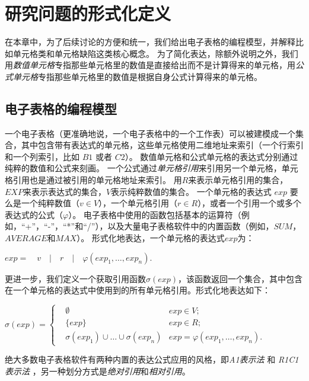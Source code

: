 \chapter{研究问题的形式化定义}

在本章中，为了后续讨论的方便和统一，我们给出电子表格的编程模型，并解释比如单元格类和单元格缺陷这类核心概念。
为了简化表达，除额外说明之外，我们用\textit{数值单元格}专指那些单元格里的数值是直接给出而不是计算得来的单元格，用\textit{公式单元格}专指那些单元格里的数值是根据自身公式计算得来的单元格。

\section{电子表格的编程模型}

一个电子表格（更准确地说，一个电子表格中的一个工作表）可以被建模成一个集合，其中包含带有表达式的单元格，这些单元格使用二维地址来索引（一个行索引和一个列索引，比如 $B1$ 或者 $C2$）。
数值单元格和公式单元格的表达式分别通过纯粹的数值和公式来刻画。
一个公式通过\textit{单元格引用}来引用另一个单元格，单元格引用也是通过被引用的单元格地址来索引。
用$R$来表示单元格引用的集合，$EXP$来表示表达式的集合，$V$表示纯粹数值的集合。
一个单元格的表达式 $exp$ 要么是一个纯粹数值（$v \in V$），一个单元格引用（$r \in R$），或者一个引用一个或多个表达式的公式（$\varphi $）。
电子表格中使用的函数包括基本的运算符（例如，“+”，“-”，“*”和“/”），以及大量电子表格软件中的内置函数（例如，$SUM$，$AVERAGE$和$MAX$）。
形式化地表达，一个单元格的表达式$exp$为：
\begin{definition}
    $ exp =\quad v\quad |\quad r\quad |\quad \varphi (exp_1,\dots,exp_n). $
\end{definition}

更进一步，我们定义一个获取引用函数$\sigma(exp)$，该函数返回一个集合，其中包含在一个单元格的表达式中使用到的所有单元格引用。形式化地表达如下：
\begin{definition}
$
\sigma(exp) = 
\left\{
    \begin{aligned}
       & \emptyset & exp \in V; \\
       & \{exp\}     & exp \in R; \\
       & \sigma(exp_1) \cup \dots \cup \sigma(exp_n) & exp = \varphi(exp_1, \dots , exp_n).
    \end{aligned}
\right.
$
\end{definition}





\begin{definition}
    绝大多数电子表格软件有两种内置的表达公式应用的风格，即\textit{A1表示法} 和 \textit{R1C1表示法} \cite{tan2014bug} ，另一种划分方式是\textit{绝对引用}和\textit{相对引用}。
\end{definition}

